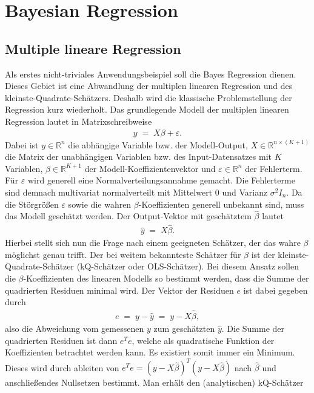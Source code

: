 \newpage
\thispagestyle{plain}
\section{Bayesian Regression}

\subsection{Multiple lineare Regression}

Als erstes nicht-triviales Anwendungsbeispiel soll die Bayes Regression dienen. Dieses Gebiet ist eine Abwandlung der multiplen linearen Regression und des kleinste-Quadrate-Schätzers. Deshalb wird die klassische Problemstellung der Regression kurz wiederholt. Das grundlegende Modell der multiplen linearen Regression lautet in Matrixschreibweise
\begin{align*}
	y\;=\;X\beta+\varepsilon.
\end{align*}
Dabei ist \(y\in\mathbb{R}^n\) die abhängige Variable bzw. der Modell-Output, \(X\in\mathbb{R}^{n\times (K+1)}\) die Matrix der unabhängigen Variablen bzw. des Input-Datensatzes mit \(K\) Variablen, \(\beta\in\mathbb{R}^{K+1}\) der Modell-Koeffizientenvektor und \(\varepsilon\in\mathbb{R}^{n}\) der Fehlerterm. Für \(\varepsilon\) wird generell eine Normalverteilungsannahme gemacht. Die Fehlerterme sind demnach multivariat normalverteilt mit Mittelwert 0 und Varianz \(\sigma^2I_n\). Da die Störgrößen \(\varepsilon\) sowie die wahren \(\beta\)-Koeffizienten generell unbekannt sind, muss das Modell geschätzt werden. Der Output-Vektor mit geschätztem \(\hat{\beta}\) lautet
\begin{align*}
	\hat{y}\;=\;X\hat{\beta}.
\end{align*}
Hierbei stellt sich nun die Frage nach einem geeigneten Schätzer, der das wahre \(\beta\) möglichst genau trifft. Der bei weitem bekannteste Schätzer für \(\beta\) ist der kleinste-Quadrate-Schätzer (kQ-Schätzer oder OLS-Schätzer). Bei diesem Ansatz sollen die \(\beta\)-Koeffizienten des linearen Modells so bestimmt werden, dass die Summe der quadrierten Residuen minimal wird. Der Vektor der Residuen \(e\) ist dabei gegeben durch
\begin{align*}
	e\;=\;y-\hat{y}\;=\;y-X\hat{\beta},
\end{align*}
also die Abweichung vom gemessenen \(y\) zum geschätzten \(\hat{y}\). Die Summe der quadrierten Residuen ist dann \(e^Te\), welche als quadratische Funktion der Koeffizienten betrachtet werden kann. Es existiert somit immer ein Minimum. Dieses wird durch ableiten von \(e^Te=\left(y-X\hat{\beta}\right)^T\left(y-X\hat{\beta}\right)\) nach \(\hat{\beta}\) und anschließendes Nullsetzen bestimmt. Man erhält den (analytischen) kQ-Schätzer
